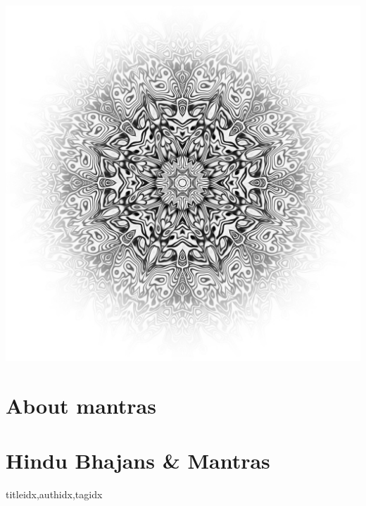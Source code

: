 \documentclass[twoside,10pt]{book}
\begin{document}
  \clearpage %
  \begin{center}%
    \vspace*{\fill}%
    \includegraphics[width=1\textwidth]{shamanic_mandala_bw_transparent_bg_CC0_1400px.jpg}
    \vspace*{\fill}%
  \end{center}

  \clearpage\scleardpage
     \section{About mantras}
       
     \clearpage\scleardpage
    \section{Hindu Bhajans \& Mantras}
      \begin{songs}{titleidx,authidx,tagidx}
        \setcounter{songnum}{100}
        
      \end{songs}
     \scleardpage
\end{document}

